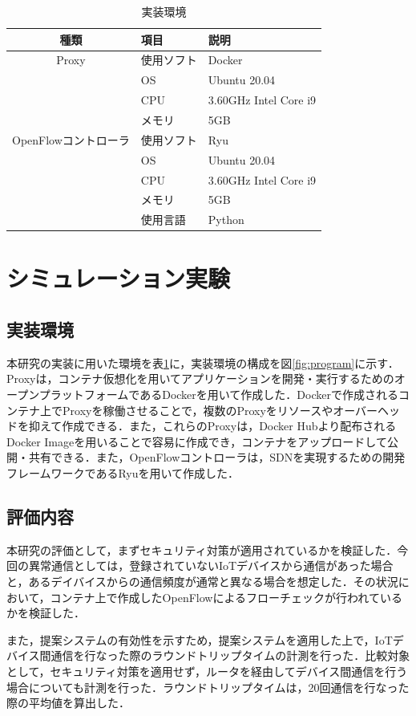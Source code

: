 \documentclass[Japanese]{dicomopapers}
\begin{document}
\begin{table}[!tb]
	\caption{実装環境}
	\label{tab:program}
	\centering
	\begin{tabular}{c|l|l}
		\hline
		種類                 & 項目       & 説明                  \\
		\hline \hline
		Proxy                & 使用ソフト & Docker                \\
		                     & OS         & Ubuntu 20.04          \\
		                     & CPU        & 3.60GHz Intel Core i9 \\
		                     & メモリ     & 5GB                   \\
		\hline
		OpenFlowコントローラ & 使用ソフト & Ryu                   \\
		                     & OS         & Ubuntu 20.04          \\
		                     & CPU        & 3.60GHz Intel Core i9 \\
		                     & メモリ     & 5GB                   \\
		                     & 使用言語   & Python                \\
		\hline
	\end{tabular}
\end{table}

\section{シミュレーション実験}
\subsection{実装環境}
本研究の実装に用いた環境を表\ref{tab:program}に，実装環境の構成を図\ref{fig:program}に示す．Proxyは，コンテナ仮想化を用いてアプリケーションを開発・実行するためのオープンプラットフォームであるDockerを用いて作成した．Dockerで作成されるコンテナ上でProxyを稼働させることで，複数のProxyをリソースやオーバーヘッドを抑えて作成できる．また，これらのProxyは，Docker Hubより配布されるDocker Imageを用いることで容易に作成でき，コンテナをアップロードして公開・共有できる．また，OpenFlowコントローラは，SDNを実現するための開発フレームワークであるRyuを用いて作成した．

\subsection{評価内容}
本研究の評価として，まずセキュリティ対策が適用されているかを検証した．今回の異常通信としては，登録されていないIoTデバイスから通信があった場合と，あるデイバイスからの通信頻度が通常と異なる場合を想定した．その状況において，コンテナ上で作成したOpenFlowによるフローチェックが行われているかを検証した．\par
また，提案システムの有効性を示すため，提案システムを適用した上で，IoTデバイス間通信を行なった際のラウンドトリップタイムの計測を行った．比較対象として，セキュリティ対策を適用せず，ルータを経由してデバイス間通信を行う場合についても計測を行った．ラウンドトリップタイムは，20回通信を行なった際の平均値を算出した．
\end{document}
